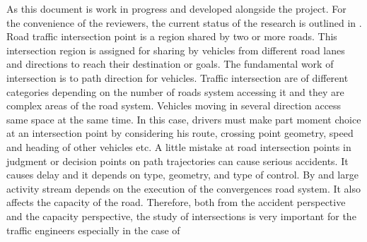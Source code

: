 \documentclass{book}
\begin{document}
\textit{\color{red}} As this document is work in progress and developed alongside the project.
For the convenience of the reviewers, the current status of the research is outlined in . Road traffic intersection point is a region shared by two or more roads. This intersection region is assigned for sharing by vehicles from different road lanes and directions to reach their destination or goals. The fundamental work of intersection is to path direction for vehicles. Traffic intersection are of different categories depending on the number of roads system accessing it  and they are complex areas of the road system. Vehicles moving in several direction access same space at the same time. In this case, drivers must make part moment choice at an intersection point by considering his route, crossing point geometry, speed and heading of other vehicles etc. A little mistake at road intersection points in judgment or decision points on path trajectories can cause serious accidents. It causes delay and it depends on type, geometry, and type of control. By and large activity stream depends on the execution of the convergences road system. It also affects the capacity of the road. Therefore, both from the accident perspective and the capacity perspective, the study of intersections is very important for the traffic engineers especially in the case of
\end{document}
